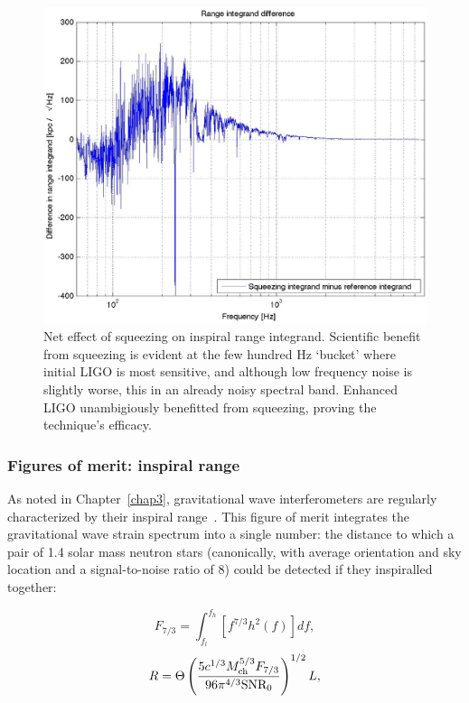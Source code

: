\begin{figure}
\begin{center}
\includegraphics[height=0.5\paperheight, width=0.5\paperwidth,keepaspectratio]{range_integrand_difference.eps}
\caption{Net effect of squeezing on inspiral range integrand. Scientific benefit from squeezing is evident at the few hundred Hz `bucket' where initial LIGO is most sensitive, and although low frequency noise is slightly worse, this in an already noisy spectral band. Enhanced LIGO unambigiously benefitted from squeezing, proving the technique's efficacy.
}
\label{squeezing_range_net}
\end{center}
\end{figure}

            \subsubsection{Figures of merit: inspiral range}
            \label{range_est}

As noted in Chapter~\ref{chap3}, gravitational wave interferometers are regularly characterized by their inspiral range~\cite{FinnInspiral1993}.
This figure of merit integrates the gravitational wave strain spectrum into a single number: the distance to which a pair of 1.4 solar mass neutron stars (canonically, with average orientation and sky location and a signal-to-noise ratio of 8) could be detected if they inspiralled together:

\begin{equation}
F_{7/3} = \int_{f_l}^{f_h} \left[f^{7/3} h^2(f) \right] df,
\label{f-seven-thirds-squeezing}
\end{equation}
\begin{equation}
R = \Theta \left( \frac{5 c^{1/3} M_\textup{ch}^{5/3} F_{7/3}}{96 \pi^{4/3} \textup{SNR}_0} \right)^{1/2} L,
\label{inspiral_range_squeezing}
\end{equation}

